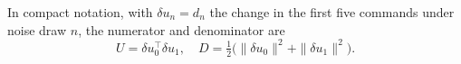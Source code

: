 In compact notation, with $\delta u_n=d_n$ the change in the first five commands under noise draw $n$, the numerator and denominator are
\begin{equation}
U=\delta u_0^\top\delta u_1,\quad
D=\tfrac12\bigl(\|\delta u_0\|^2+\|\delta u_1\|^2\bigr).
\label{eq:command-consistency}
\end{equation}
